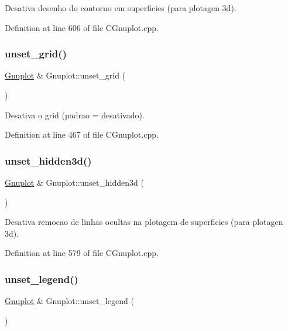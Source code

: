 Desativa desenho do contorno em superficies (para plotagen 3d). 



Definition at line 606 of file C\+Gnuplot.\+cpp.

\mbox{\label{class_gnuplot_a8b9a16d5793c3f4939b917b2c263860c}} 
\subsubsection{\texorpdfstring{unset\+\_\+grid()}{unset\_grid()}}
{\footnotesize\ttfamily \hyperlink{class_gnuplot}{Gnuplot} \& Gnuplot\+::unset\+\_\+grid (\begin{DoxyParamCaption}{ }\end{DoxyParamCaption})}



Desativa o grid (padrao = desativado). 



Definition at line 467 of file C\+Gnuplot.\+cpp.

\mbox{\label{class_gnuplot_a763ff17df1679cc2b1463b024aa89ebc}} 
\subsubsection{\texorpdfstring{unset\+\_\+hidden3d()}{unset\_hidden3d()}}
{\footnotesize\ttfamily \hyperlink{class_gnuplot}{Gnuplot} \& Gnuplot\+::unset\+\_\+hidden3d (\begin{DoxyParamCaption}{ }\end{DoxyParamCaption})}



Desativa remocao de linhas ocultas na plotagem de superficies (para plotagen 3d). 



Definition at line 579 of file C\+Gnuplot.\+cpp.

\mbox{\label{class_gnuplot_a584e0710d7f5bcaa35653d1987f1563e}} 
\subsubsection{\texorpdfstring{unset\+\_\+legend()}{unset\_legend()}}
{\footnotesize\ttfamily \hyperlink{class_gnuplot}{Gnuplot} \& Gnuplot\+::unset\+\_\+legend (\begin{DoxyParamCaption}{ }\end{DoxyParamCaption})}



